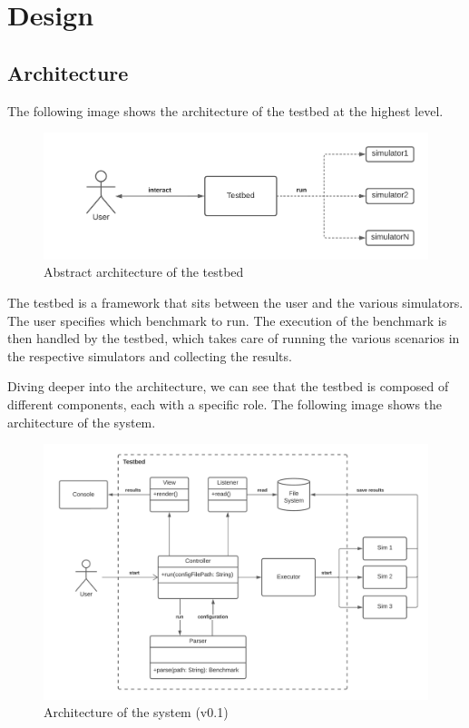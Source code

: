 \documentclass[12pt,a4paper,openright,twoside]{book}
\begin{document}
\chapter{Design}

\section{Architecture}

The following image shows the architecture of the testbed at the highest level.

\begin{figure}[H]
  \centering
  \includegraphics[width=\textwidth]{figures/architecture-high-level.png}
  \caption{Abstract architecture of the testbed}
\end{figure}

The testbed is a framework that sits between the user and the various simulators. 
The user specifies which benchmark to run. 
The execution of the benchmark is then handled by the testbed, which takes care of running the various scenarios in the respective simulators and collecting the results.

Diving deeper into the architecture, we can see that the testbed is composed of different components, each with a specific role.
The following image shows the architecture of the system.

\begin{figure}[H]
  \centering
  \includegraphics[width=\textwidth]{figures/testbed-architecture.png}
  \caption{Architecture of the system (v0.1)}
  \label{fig:random-image}
\end{figure}
\end{document}
